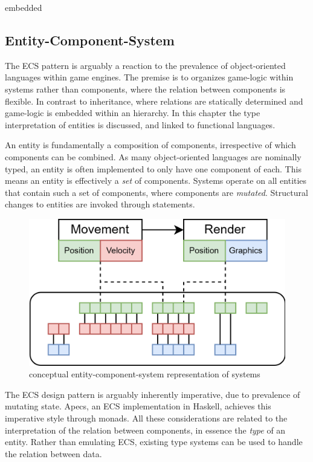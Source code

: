 \documentclass{article}
\begin{document}
embedded


\subsection{Entity-Component-System}

The ECS pattern is arguably a reaction to the prevalence of object-oriented languages within game engines.
The premise is to organizes game-logic within systems rather than components, where the relation between components is flexible\cite{ecs-origin}.
In contrast to inheritance, where relations are statically determined and game-logic is embedded within an hierarchy.
In this chapter the type interpretation of entities is discussed, and linked to functional languages.

An entity is fundamentally a composition of components, irrespective of which components can be combined.
As many object-oriented languages are nominally typed, an entity is often implemented to only have one component of each.
This means an entity is effectively a {\it set} of components.
Systems operate on all entities that contain such a set of components, where components are {\it mutated}.
Structural changes to entities are invoked through statements.

\begin{figure}[ht]
    \centering
    \includegraphics[scale=0.2]{ecs}
    \caption{ conceptual entity-component-system representation of systems }
\end{figure}

The ECS design pattern is arguably inherently imperative, due to prevalence of mutating state. 
Apecs, an ECS implementation in Haskell, achieves this imperative style through monads\cite{ecs-apecs}.
All these considerations are related to the interpretation of the relation between components, in essence the {\it type} of an entity. 
Rather than emulating ECS, existing type systems can be used to handle the relation between data.
\end{document}
